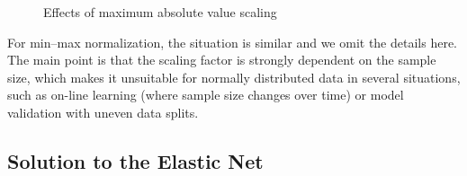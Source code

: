 \begin{figure}[htpb]
  \centering
  \hspace{1cm}
  \caption{%
    Effects of maximum absolute value scaling
  }
\end{figure}

For min--max normalization, the situation is similar and we omit the details here. The main
point is that the scaling factor is strongly dependent on the sample size, which makes it
unsuitable for normally distributed data in several situations, such as on-line learning
(where sample size changes over time) or model validation with uneven data splits.

\subsection{Solution to the Elastic Net}%
\label{sec:elastic-net-estimator}

